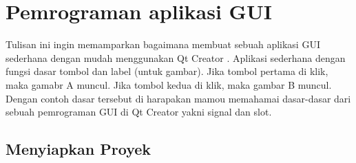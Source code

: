\minitoc

\section{Pemrograman aplikasi GUI}

Tulisan ini ingin memamparkan bagaimana membuat sebuah aplikasi GUI sederhana dengan mudah
menggunakan Qt Creator . Aplikasi sederhana dengan fungsi  dasar tombol dan label (untuk gambar).
Jika tombol pertama di klik, maka gamabr A muncul. Jika tombol kedua di klik, maka gambar 
B muncul. Dengan contoh dasar tersebut di harapakan mamou memahamai dasar-dasar dari sebuah 
pemrograman GUI di Qt Creator yakni signal dan slot.

\subsection{Menyiapkan Proyek}

